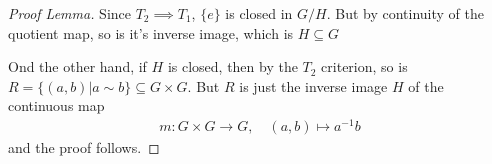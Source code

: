 \begin{proof}[Proof Lemma]
  Since $T_2 \implies T_1$, $\{e\}$ is closed in $G/H$. 
  But by continuity of the quotient map, so is it's inverse image, which is $H \subseteq G$

  Ond the other hand, if $H$ is closed, then by the $T_2$ criterion, so is $R = \{(a,b) \big\vert a \sim b\} \subseteq G \times G$.
  But $R$ is just the inverse image $H$ of the continuous map 
  \begin{align*}
    m: G \times G \to G, \quad (a,b) \mapsto a^{-1}b
  \end{align*}
  and the proof follows.
\end{proof}
